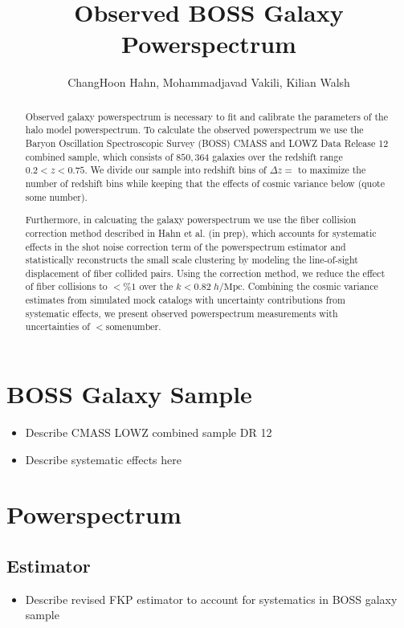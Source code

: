 \documentclass{article}
\begin{document}
\title{Observed BOSS Galaxy Powerspectrum}
\author{ChangHoon Hahn, Mohammadjavad Vakili, Kilian Walsh}

\begin{abstract}
Observed galaxy powerspectrum is necessary to fit and calibrate the parameters 
of the halo model powerspectrum. To calculate the observed powerspectrum we use 
the Baryon Oscillation Spectroscopic Survey (BOSS) CMASS and LOWZ Data Release 12 
combined sample, which consists of $850,364$ galaxies over the redshift range 
$0.2 < z < 0.75$. We divide our sample into redshift bins of $\Delta z = $ to 
maximize the number of redshift bins while keeping that the effects of cosmic 
variance below (quote some number). 

Furthermore, in calcuating the galaxy powerspectrum we use 
the fiber collision correction method described in Hahn et al. (in prep), which 
accounts for systematic effects in the shot noise correction term of the 
powerspectrum estimator and statistically reconstructs the small scale clustering 
by modeling the line-of-sight displacement of fiber collided pairs. Using the
correction method, we reduce the effect of fiber collisions to $<\% 1$ over the 
$k < 0.82\;h/\mathrm{Mpc}$. Combining the cosmic variance estimates from simulated
mock catalogs with uncertainty contributions from systematic effects, we present
observed powerspectrum measurements with uncertainties of $< \mathrm{somenumber}$. 
\end{abstract}

\section{BOSS Galaxy Sample} \label{sec:cmasslowz}

\begin{itemize}
\item Describe CMASS LOWZ combined sample DR 12 
\item Describe systematic effects here 
\end{itemize}

\section{Powerspectrum}
\subsection{Estimator} 
\begin{itemize}
\item Describe revised FKP estimator to account for systematics in BOSS galaxy sample 
\end{itemize}
\end{document}
